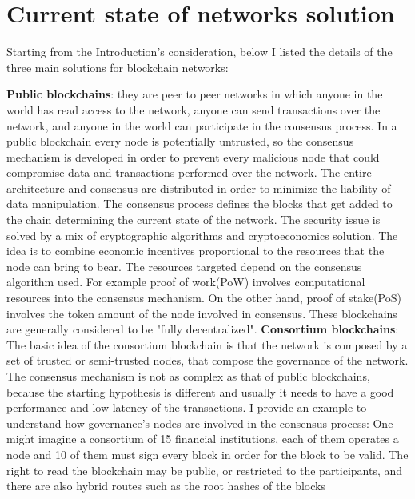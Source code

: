 \section{Current state of networks solution}

Starting from the Introduction's consideration, below I listed the details of the three main solutions for 
blockchain networks\cite{private-public}:

\begin{outline}
    \1 \textbf{Public blockchains}: they are peer to peer networks in which anyone in the world has read 
    access to the network, anyone can send transactions over the network, and anyone in the world can 
    participate in the consensus process. In a public blockchain every node is potentially 
    untrusted, so the consensus mechanism is developed in order to prevent every malicious node that could 
    compromise data and transactions performed over the network. The entire architecture and consensus are 
    distributed in order to minimize the liability of data manipulation. The consensus process defines the blocks that get added to the chain
    determining the current state of the network. The security issue is solved by a mix of cryptographic algorithms
    and cryptoeconomics solution. The idea is to combine economic incentives proportional to the resources that
    the node can bring to bear. The resources targeted depend on the consensus algorithm used. For example proof of work(PoW)
    involves computational resources into the consensus mechanism. On the other hand, proof of stake(PoS) involves
    the token amount of the node involved in consensus. These blockchains are generally considered 
    to be "fully decentralized".
    \1 \textbf{Consortium blockchains}: The basic idea of the consortium blockchain is that the network is 
    composed by a set of trusted or semi-trusted nodes, that compose the governance of the network.
    The consensus mechanism is not as complex as that of public blockchains, because the starting hypothesis is 
    different and usually it needs to have a good performance and low latency of the transactions.
    I provide an example to understand how governance's nodes are involved in the consensus process: 
    One might imagine a consortium of 15 financial institutions, each of them operates a node and 10 of them 
    must sign every block in order for the block to be valid. The right to read the blockchain may be public, 
    or restricted to the participants, and there are also hybrid routes such as the root hashes of the blocks 

\end{outline}
